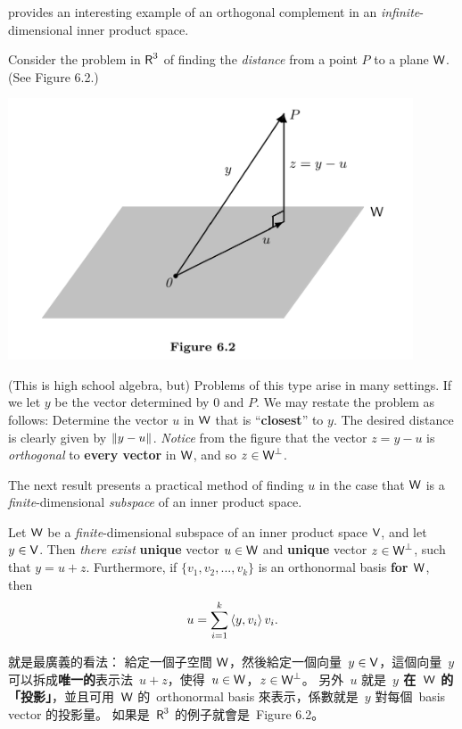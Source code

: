  provides an interesting example of an orthogonal complement in an \emph{infinite}-dimensional inner product space. 
\begin{remark} \label{remark 6.2.7}
Consider the problem in \(\textsf{R}^3\) of finding the \emph{distance} from a point \(P\) to a plane \(\textsf{W}\).
(See Figure 6.2.)

\includegraphics[width=12cm]{images/figure-6-2.png}

(This is high school algebra, but) Problems of this type arise in many settings.
If we let \(y\) be the vector determined by \(0\) and \(P\).
We may restate the problem as follows:
Determine the vector \(u\) in \(\textsf{W}\) that is ``\textbf{closest}'' to \(y\).
The desired distance is clearly given by \(\left\lVert y - u\right\rVert\).
\emph{Notice} from the figure that the vector \(z = y - u\) is \emph{orthogonal} to \textbf{every vector} in \(\textsf{W}\), and so \(z \in \textsf{W}^{\perp}\).

The next result presents a practical method of finding \(u\) in the case that \(\textsf{W}\) is a \emph{finite}-dimensional \emph{subspace} of an inner product space.
\end{remark}

\begin{theorem} \label{thm 6.6}
Let \(\textsf{W}\) be a \emph{finite}-dimensional subspace of an inner product space \(\textsf{V}\), and let \(y \in \textsf{V}\).
Then \emph{there exist} \textbf{unique} vector \(u \in \textsf{W}\) and \textbf{unique} vector \(z \in \textsf{W}^{\perp}\), such that \(y = u + z\).
Furthermore, if \(\{ v_1, v_2, ..., v_k \}\) is an orthonormal basis \textbf{for \(\textsf{W}\)}, then
\[
    u = \sum_{i = 1}^k \left< y, v_i \right> v_i.
\]
\end{theorem}

\begin{note}
 就是最廣義的看法：
給定一個子空間 \(\textsf{W}\)，然後給定一個向量\ \(y \in \textsf{V}\)，這個向量\ \(y\) 可以拆成\textbf{唯一的}表示法\ \(u + z\)，使得\ \(u \in \textsf{W}\)，\(z \in \textsf{W}^{\perp}\)。
另外\ \(u\) 就是\ \textbf{\(y\) 在\ \(\textsf{W}\) 的「投影」}，並且可用\ \(\textsf{W}\) 的\ orthonormal basis 來表示，係數就是\ \(y\) 對每個\ basis vector 的投影量。
如果是\ \(\textsf{R}^3\) 的例子就會是\ Figure 6.2。
\end{note}

